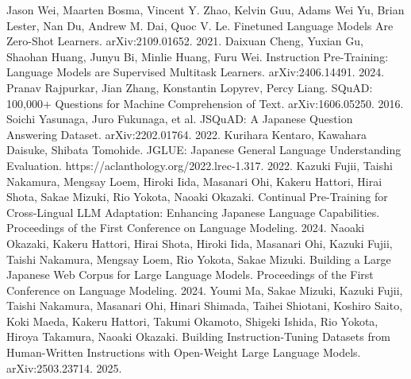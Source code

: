 \documentclass[twocolumn]{jsarticle}
\begin{document}
\begin{thebibliography}{99}
  Jason Wei, Maarten Bosma, Vincent Y. Zhao, Kelvin Guu, Adams Wei Yu, Brian Lester, Nan Du, Andrew M. Dai, Quoc V. Le. Finetuned Language Models Are Zero-Shot Learners. arXiv:2109.01652. 2021.
  Daixuan Cheng, Yuxian Gu, Shaohan Huang, Junyu Bi, Minlie Huang, Furu Wei. Instruction Pre-Training: Language Models are Supervised Multitask Learners. arXiv:2406.14491. 2024.
  Pranav Rajpurkar, Jian Zhang, Konstantin Lopyrev, Percy Liang. SQuAD: 100,000+ Questions for Machine Comprehension of Text. arXiv:1606.05250. 2016.
  Soichi Yasunaga, Juro Fukunaga, et al. JSQuAD: A Japanese Question Answering Dataset. arXiv:2202.01764. 2022.
  Kurihara Kentaro, Kawahara Daisuke, Shibata Tomohide. JGLUE: Japanese General Language Understanding Evaluation. https://aclanthology.org/2022.lrec-1.317. 2022.
  Kazuki Fujii, Taishi Nakamura, Mengsay Loem, Hiroki Iida, Masanari Ohi, Kakeru Hattori, Hirai Shota, Sakae Mizuki, Rio Yokota, Naoaki Okazaki. Continual Pre-Training for Cross-Lingual LLM Adaptation: Enhancing Japanese Language Capabilities. Proceedings of the First Conference on Language Modeling. 2024.
  Naoaki Okazaki, Kakeru Hattori, Hirai Shota, Hiroki Iida, Masanari Ohi, Kazuki Fujii, Taishi Nakamura, Mengsay Loem, Rio Yokota, Sakae Mizuki. Building a Large Japanese Web Corpus for Large Language Models. Proceedings of the First Conference on Language Modeling. 2024.
  Youmi Ma, Sakae Mizuki, Kazuki Fujii, Taishi Nakamura, Masanari Ohi, Hinari Shimada, Taihei Shiotani, Koshiro Saito, Koki Maeda, Kakeru Hattori, Takumi Okamoto, Shigeki Ishida, Rio Yokota, Hiroya Takamura, Naoaki Okazaki. Building Instruction-Tuning Datasets from Human-Written Instructions with Open-Weight Large Language Models. arXiv:2503.23714. 2025.
\end{thebibliography}
\end{document}
